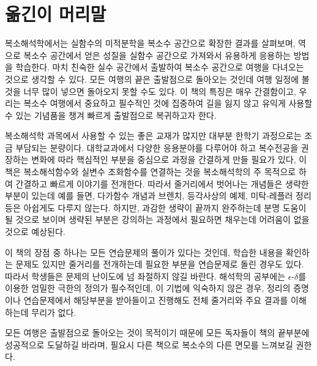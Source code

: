 

\chapter*[옮긴이 머리말]{옮긴이 머리말}



복소해석학에서는 실함수의 미적분학을 
복소수 공간으로 확장한 결과를 살펴보며,
역으로 복소수 공간에서 얻은 성질을 
실함수 공간으로 가져와서 유용하게 응용하는 방법을 학습한다. 
마치 친숙한 실수 공간에서 출발하여
복소수 공간으로 여행을 다녀오는 것으로 생각할 수 있다.
모든 여행의 끝은 출발점으로 돌아오는 것인데
여행 일정에 	볼 것을 너무 많이 넣으면  돌아오지 못할 수도 있다.
이 책의 특징은 매우 간결함이고, 우리는 복소수 여행에서
중요하고 필수적인 것에 집중하여
길을 잃지 않고 유익게 사용할 수 있는 기념품을 챙겨 빠르게 출발점으로 복귀하고자 한다.


복소해석학 과목에서 사용할 수 있는 좋은 교재가 많지만
대부분 한학기 과정으로는 조금 부담되는 분량이다. 
대학교과에서 다양한 응용분야를 다루어야 하고 
복수전공을 권장하는 변화에 따라 핵심적인 부분을 중심으로 과정을 간결하게 만들 필요가 있다,
이 책은 복소해석함수와 실변수 조화함수를 연결하는 것을
복소해석학의 주 목적으로 하여 간결하고 빠르게 이야기를 전개한다.
따라서 줄거리에서 벗어나는 개념들은 생략한 부분이 있는데
예를 들면, 다가함수 개념과 브렌치, 등각사상의 예제, 미탁-레플러 정리 등은
아쉽게도 다루지 않는다.
하지만, 과감한 생략이 끝까지 완주하는데 분명 도움이 될 것으로 보이며
생략된 부분은 강의하는 과정에서 필요하면 채우는데 어려움이 없을 것으로 예상된다.

이 책의 장점 중 하나는 모든 연습문제의 풀이가 있다는 것인데,
학습한 내용을 확인하는 문제도 있지만
줄거리를 전개하는데 필요한 부분을 연습문제로 돌린 경우도 있다.
따라서 학생들은 문제의 난이도에 넘 좌절하지 않길 바란다.
해석학의 공부에는 $\epsilon$-$\delta$를 이용한 엄밀한 극한의 정의가
필수적인데, 이 기법에 익숙하지 않은 경우, 정리의 증명이나 연습문제에서 
해당부분을 받아들이고 진행해도 전체 줄거리와 주요 결과를 이해하는데 무리가 없다.

모든 여행은 출발점으로 돌아오는 것이 목적이기 때문에
모든 독자들이 책의 끝부분에 성공적으로 도달하길 바라며,
필요시 다른 책으로 복소수의 다른 면모를 느껴보길 권한다.




\clearpage





